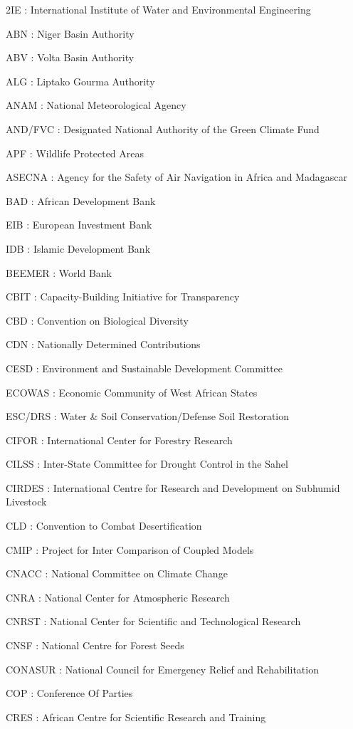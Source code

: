 \documentclass[
]{book}
\begin{document}
2IE : International Institute of Water and Environmental Engineering

ABN : Niger Basin Authority

ABV : Volta Basin Authority

ALG : Liptako Gourma Authority

ANAM : National Meteorological Agency

AND/FVC : Designated National Authority of the Green Climate Fund

APF : Wildlife Protected Areas

ASECNA : Agency for the Safety of Air Navigation in Africa and Madagascar

BAD : African Development Bank

EIB : European Investment Bank

IDB : Islamic Development Bank

BEEMER : World Bank

CBIT : Capacity-Building Initiative for Transparency

CBD : Convention on Biological Diversity

CDN : Nationally Determined Contributions

CESD : Environment and Sustainable Development Committee

ECOWAS : Economic Community of West African States

ESC/DRS : Water \& Soil Conservation/Defense Soil Restoration

CIFOR : International Center for Forestry Research

CILSS : Inter-State Committee for Drought Control in the Sahel

CIRDES : International Centre for Research and Development on Subhumid Livestock

CLD : Convention to Combat Desertification

CMIP : Project for Inter Comparison of Coupled Models

CNACC : National Committee on Climate Change

CNRA : National Center for Atmospheric Research

CNRST : National Center for Scientific and Technological Research

CNSF : National Centre for Forest Seeds

CONASUR : National Council for Emergency Relief and Rehabilitation

COP : Conference Of Parties

CRES : African Centre for Scientific Research and Training
\end{document}

